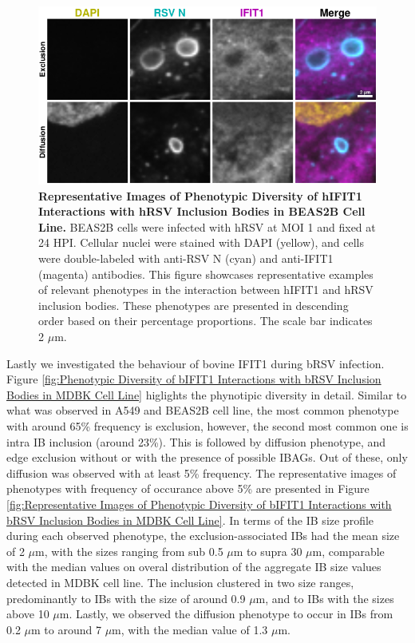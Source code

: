 \begin{figure}
    \centering
    \includegraphics[width=1\linewidth]{08. Chapter 3/Figs/02. Infection/01. IFIT1/06. beas2b i1.pdf}
    \caption[Representative Images of Phenotypic Diversity of hIFIT1 Interactions with hRSV Inclusion Bodies in BEAS2B Cell Line.]{\textbf{Representative Images of Phenotypic Diversity of hIFIT1 Interactions with hRSV Inclusion Bodies in BEAS2B Cell Line.} BEAS2B cells were infected with hRSV at MOI 1 and fixed at 24 HPI. Cellular nuclei were stained with DAPI (yellow), and cells were double-labeled with anti-RSV N (cyan) and anti-IFIT1 (magenta) antibodies. This figure showcases representative examples of relevant phenotypes in the interaction between hIFIT1 and hRSV inclusion bodies. These phenotypes are presented in descending order based on their percentage proportions. The scale bar indicates 2 \(\mu \mbox{m}\).}
    \label{fig:Representative Images of Phenotypic Diversity of hIFIT1 Interactions with hRSV Inclusion Bodies in BEAS2B Cell Line}
\end{figure}

Lastly we investigated the behaviour of bovine IFIT1 during bRSV infection. Figure \ref{fig:Phenotypic Diversity of bIFIT1 Interactions with bRSV Inclusion Bodies in MDBK Cell Line} higlights the phynotipic diversity in detail. Similar to what was observed in A549 and BEAS2B cell line, the most common phenotype with around 65\% frequency is exclusion, however, the second most common one is intra IB inclusion (around 23\%). This is followed by diffusion phenotype, and edge exclusion without or with the presence of possible IBAGs. Out of these, only diffusion was observed with at least 5\% frequency. The representative images of phenotypes with frequency of occurance above 5\% are presented in Figure \ref{fig:Representative Images of Phenotypic Diversity of bIFIT1 Interactions with bRSV Inclusion Bodies in MDBK Cell Line}. In terms of the IB size profile during each observed phenotype, the exclusion-associated IBs had the mean size of 2 \(\mu \mbox{m}\), with the sizes ranging from sub 0.5 \(\mu \mbox{m}\) to supra 30 \(\mu \mbox{m}\), comparable with the median values on overal distribution of the aggregate IB size values detected in MDBK cell line. The inclusion clustered in two size ranges, predominantly to IBs with the size of around 0.9 \(\mu \mbox{m}\), and to IBs with the sizes above 10 \(\mu \mbox{m}\). Lastly, we observed the diffusion phenotype to occur in IBs from 0.2 \(\mu \mbox{m}\) to around 7 \(\mu \mbox{m}\), with the median value of 1.3 \(\mu \mbox{m}\).

